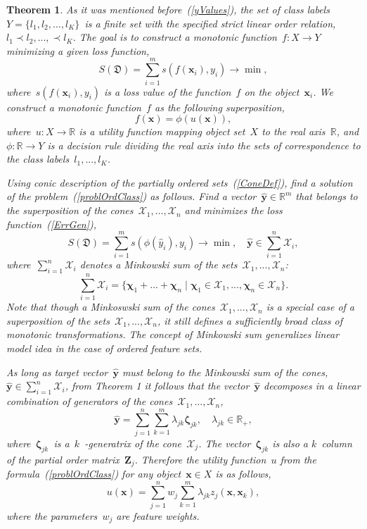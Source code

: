 \documentclass[12pt,preprint]{elsarticle}
\newcommand{\bx}{\mathbf{x}}
\newcommand{\by}{\mathbf{y}}
\newcommand{\bZ}{\mathbf{Z}}
\newcommand{\bchi}{\boldsymbol{\chi}}
\newcommand{\bzeta}{\boldsymbol{\zeta}}
\newtheorem{Theorem}{Theorem}
\begin{document}
\begin{Theorem}
As it was mentioned before~(\ref{yValues}), the set of class labels~$Y=\{l_1,l_2,...,l_K\}$~is a finite set with the specified strict linear order relation,~$l_1\prec l_2,...,\prec l_K$. The goal is to construct a monotonic function~$f:X\rightarrow Y$ minimizing a given loss function,
\begin{equation}
S(\mathfrak{D})=\sum\limits_{i=1}^m{s(f(\bx_i), y_i)}\rightarrow \min,
\label{ErrGen}
\end{equation}
where~$s(f(\bx_i), y_i)$ is a loss value of the function~$f$ on the object~$\bx_i$.
We construct a monotonic function~$f$ as the following superposition,
\begin{equation}
f(\bx)=\phi(u(\bx)),
\label{problOrdClass}
\end{equation}
where~$u:X\rightarrow \mathbb{R}$ is a \emph{utility function} mapping object set~$X$ to the real axis~$\mathbb{R}$, and $\phi:\mathbb{R}\rightarrow Y$ is a \emph{decision rule} dividing the real axis into the sets of correspondence to the class labels~$l_1,...,l_K$.

Using conic description of the partially ordered sets~(\ref{ConeDef}), find a solution of the problem~(\ref{problOrdClass}) as follows. Find a vector~$\hat{\by}\in \mathbb{R}^m$ that belongs to the superposition of the cones~$\mathcal{X}_1,...,\mathcal{X}_n$ and minimizes the loss function~(\ref{ErrGen}),
\[
S(\mathfrak{D})=\sum\limits_{i=1}^m{s(\phi(\hat{y}_i), y_i)}\rightarrow \min,\quad \hat{\by}\in \sum\limits_{i=1}^n\mathcal{X}_i,
\]
where~$\sum\limits_{i=1}^n\mathcal{X}_i$ denotes a Minkowski sum of the sets~$\mathcal{X}_1,...,\mathcal{X}_n$:
\[
\sum\limits_{i=1}^n\mathcal{X}_i=\{\bchi_1+...+\bchi_n\;|\;\bchi_1\in\mathcal{X}_1,...,\bchi_n\in\mathcal{X}_n\}.
\]
Note that though a Minkoswski sum of the cones~$\mathcal{X}_1,...,\mathcal{X}_n$ is a special case of a superposition of the sets~$\mathcal{X}_1,...,\mathcal{X}_n$, it still defines a sufficiently broad class of monotonic transformations. The concept of Minkowski sum generalizes \emph{linear model} idea in the case of ordered feature sets.

As long as target vector~$\hat{\by}$ must belong to the Minkowski sum of the cones,~$\hat{\by}\in \sum\limits_{i=1}^n\mathcal{X}_i$, from Theorem 1 it follows that the vector~$\hat{\by}$ decomposes in a linear combination of generators of the cones~$\mathcal{X}_1,...,\mathcal{X}_n$,
\[
\hat{\by}=\sum\limits_{j=1}^n\sum\limits_{k=1}^m\lambda_{jk}\bzeta_{jk},\quad \lambda_{jk}\in\mathbb{R}_+,
\]
where~$\bzeta_{jk}$~is a~$k$~-generatrix of the cone~$\mathcal{X}_j$. The vector~$\bzeta_{jk}$ is also a $k$~column of the partial order matrix~$\bZ_j$.
Therefore the utility function~$u$ from the formula~(\ref{problOrdClass}) for any object~$\bx\in X$ is as follows,
\begin{equation}
u(\bx) = \sum\limits_{j=1}^n w_j \sum\limits_{k=1}^m\lambda_{jk}z_j(\bx, \bx_k),
\label{utilityDecomp}
\end{equation}
where the parameters~$w_j$ are feature weights.


\end{Theorem}
\end{document}
